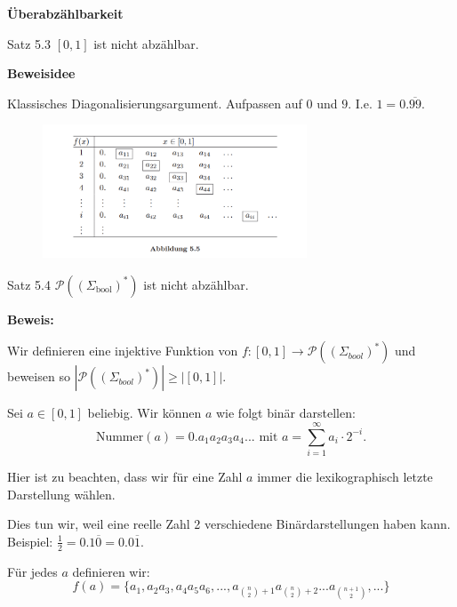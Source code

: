 \documentclass[a4paper, 11pt]{article}
\begin{document}
        
        
            \textbf{Überabzählbarkeit}

            \begin{mainbox}{Satz 5.3}
                $[0,1]$ ist nicht abzählbar.
            \end{mainbox}
            \textbf{Beweisidee}
            
            Klassisches Diagonalisierungsargument. Aufpassen auf $0$ und $9$. I.e. $1 = 0.\overline{99}$.
        
            \begin{figure}[htp]
                \includegraphics[width=0.7\textwidth]{Images/Diagonalisierung.png}
            \end{figure}
        
            \begin{mainbox}{Satz 5.4}
                $\mathcal{P}((\Sigma_{\text{bool}})^*)$ ist nicht abzählbar.
            \end{mainbox}
            \textbf{Beweis: }
        
                Wir definieren eine injektive Funktion von $f: [0, 1] \to \mathcal{P}((\Sigma_{bool})^*)$ und beweisen so $|\mathcal{P}((\Sigma_{bool})^*)| \geq |[0, 1]|$.
            
                Sei $a \in [0, 1]$ beliebig. Wir können $a$ wie folgt binär darstellen:
                $$\text{Nummer}(a) = 0.a_1a_2a_3a_4... \text{ mit } a = \sum_{i = 1}^{\infty} a_i\cdot 2^{-i}.$$ 
                
                Hier ist zu beachten, dass wir für eine Zahl $a$ immer die lexikographisch letzte Darstellung wählen.
            
            Dies tun wir, weil eine reelle Zahl 2 verschiedene Binärdarstellungen haben kann. Beispiel: $\frac{1}{2} = 0.1\overline{0} = 0.0\overline{1}$.
                
                Für jedes $a$ definieren wir:
                $$f(a) = \{a_1, a_2a_3, a_4a_5a_6, ..., a_{\binom{n}{2}+1}a_{\binom{n}{2}+2}...a_{\binom{n+1}{2}} , ...\}$$
            
\end{document}
